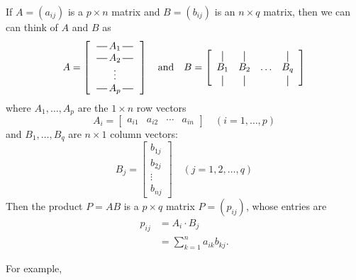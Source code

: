 \documentclass[10pt]{article}
\theoremstyle{definition}
\begin{document}
\begin{tcolorbox}[colframe=black, colback=gray!5, arc=2mm, boxrule=0.8pt,
  breakable, title=Matrix Multiplication,   coltitle=black,colbacktitle=black!10]
  If $A=(a_{ij})$ is a $p\times n$ matrix and $B=(b_{ij})$ is an $n\times q$
  matrix, then we can can think of $A$ and $B$ as
  \newcommand*{\vertbar}{\rule[-1ex]{0.5pt}{2.5ex}}
  \newcommand*{\horzbar}{\,\rule[.5ex]{2.5ex}{0.5pt}\,}
  \begin{equation*}
    A =
    \left[\begin{array}{c}
        \horzbar  A_{1}  \horzbar \\
        \horzbar  A_{2}  \horzbar \\
        \vdots             \\
        \horzbar  A_{p} \horzbar
      \end{array}\right]
    \quad \text{and} \quad
    B = 
    \left[
      \begin{array}{cccc}
        \vertbar & \vertbar &        & \vertbar \\
        B_{1}    & B_{2}    & \ldots & B_{q}    \\
        \vertbar & \vertbar &        & \vertbar 
      \end{array}
    \right]
  \end{equation*}
  where $A_{1},\ldots,A_{p}$ are the $1\times n$ row vectors
  \begin{equation*}
    A_{i} =
    \begin{bmatrix}
      a_{i1}& a_{i2}& \cdots & a_{in}
    \end{bmatrix}
    \quad (i=1,\ldots,p)
  \end{equation*}
  and $B_{1},\ldots,B_{q}$ are $n\times 1$ column vectors:
  \begin{equation*}
    B_{j} =
    \begin{bmatrix}
      b_{1j}\\b_{2j}\\\vdots\\b_{nj}
    \end{bmatrix}
    \quad (j=1,2,\ldots,q)
  \end{equation*}
Then the product $P=AB$ is a $p\times q$ matrix $P=(p_{ij})$, whose entries are
\begin{align*}
  p_{ij} 
  &= A_{i}\cdot B_{j} \\
  &= \sum_{k=1}^{n}a_{ik}b_{kj}.
\end{align*}
\end{tcolorbox}
For example,
\end{document}
